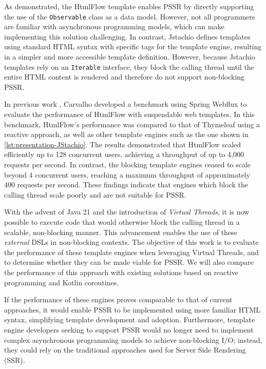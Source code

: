 As demonstrated, the HtmlFlow template enables PSSR by directly supporting the
use of the \texttt{Observable} class as a data model. However, not all
programmers are familiar with asynchronous programming models, which can make
implementing this solution challenging. In contrast, Jstachio defines templates
using standard HTML syntax with specific tags for the template engine,
resulting in a simpler and more accessible template definition. However,
because Jstachio templates rely on an \texttt{Iterable} interface,
they block the calling thread until the entire HTML content is rendered and
therefore do not support non-blocking PSSR\@.


In previous work \cite{PSSR-WISE2024}, Carvalho developed a benchmark
using Spring Webflux to evaluate the performance of HtmlFlow with suspendable
web templates. In this benchmark, HtmlFlow's performance was compared to that
of Thymeleaf using a reactive approach, as well as other template engines such
as the one shown in \autoref{lst:presentation-JStachio}. The results
demonstrated that HtmlFlow scaled efficiently up to 128 concurrent users,
achieving a throughput of up to 4,000 requests per second. In contrast, the
blocking template engines ceased to scale beyond 4 concurrent users, reaching a
maximum throughput of approximately 400 requests per second. These findings
indicate that engines which block the calling thread scale poorly and are not
suitable for PSSR\@.

With the advent of Java 21 and the introduction of \textit{Virtual Threads}, it
is now possible to execute code that would otherwise block the calling thread
in a scalable, non-blocking manner. This advancement enables the use of these
\textit{external} DSLs in non-blocking contexts. The objective of this work is
to evaluate the performance of these template engines when leveraging Virtual
Threads, and to determine whether they can be made viable for PSSR\@. We will
also compare the performance of this approach with existing solutions based on
reactive programming and Kotlin coroutines.

If the performance of these engines proves comparable to that of current
approaches, it would enable PSSR to be implemented using more familiar HTML
syntax, simplifying template development and adoption. Furthermore, template
engine developers seeking to support PSSR would no longer need to implement
complex asynchronous programming models to achieve non-blocking I/O; instead,
they could rely on the traditional approaches used for Server Side Rendering
(SSR).